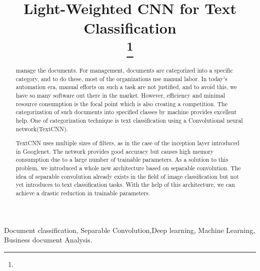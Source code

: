\documentclass[conference]{IEEEtran}
\begin{document}
\title{Light-Weighted CNN for Text Classification\\
{\footnotesize }
\thanks{}
}

\author{
}

\maketitle

\begin{abstract}
manage the documents. For management, documents are categorized into a specific category, and to do these, most of the organizations use manual labor. In today's automation era, manual efforts on such a task are not justified, and to avoid this, we have so many software out there in the market. However, efficiency and minimal resource consumption is the focal point which is also creating a competition. The categorization of such documents into specified classes by machine provides excellent help. One of categorization technique is text classification using a Convolutional neural network(TextCNN). 

TextCNN uses multiple sizes of filters, as in the case of the inception layer introduced in Googlenet. The network provides good accuracy but causes high memory consumption due to a large number of trainable parameters. As a solution to this problem, we introduced a whole new architecture based on separable convolution. The idea of separable convolution already exists in the field of image classification but not yet introduces to text classification tasks. With the help of this architecture, we can achieve a drastic reduction in trainable parameters.
\\
\end{abstract}

\begin{IEEEkeywords}

Document classification, Separable Convolution,Deep learning, Machine Learning, Business document Analysis.
\end{IEEEkeywords}
\end{document}
